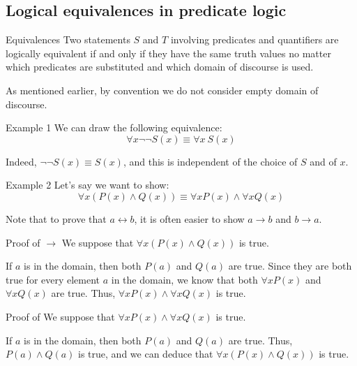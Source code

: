 \documentclass{article}
\begin{document}
\subsection{Logical equivalences in predicate logic}
\begin{parag}{Equivalences}
    Two statements $S$ and $T$ involving predicates and quantifiers are logically equivalent if and only if they have the same truth values no matter which predicates are substituted and which domain of discourse is used.

    As mentioned earlier, by convention we do not consider empty domain of discourse.
\end{parag}

\begin{parag}{Example 1}
    We can draw the following equivalence: 
    \[\forall x \lnot \lnot S\left(x\right) \equiv \forall x\ S\left(x\right)\]
    
    Indeed, $\lnot \lnot S\left(x\right) \equiv S\left(x\right)$, and this is independent of the choice of $S$ and of $x$.
\end{parag}

\begin{parag}{Example 2}
    Let's say we want to show: 
    \[\forall x \left(P\left(x\right) \land Q\left(x\right)\right) \equiv \forall x P\left(x\right) \land \forall x Q\left(x\right)\]

    Note that to prove that $a \leftrightarrow b$, it is often easier to show $a \to b$ and $b \to a$.
    
    \begin{subparag}{Proof of $\to$}
        We suppose that $\forall x\left(P\left(x\right) \land Q\left(x\right)\right)$ is true.

        If $a$ is in the domain, then both $P\left(a\right)$ and $Q\left(a\right)$ are true. Since they are both true for every element $a$ in the domain, we know that both $\forall x P\left(x\right)$ and $\forall x Q\left(x\right)$ are true. Thus, $\forall x P\left(x\right) \land \forall x Q\left(x\right)$ is true.
    \end{subparag}

    \begin{subparag}{Proof of \textleftarrow}
        We suppose that $\forall x P\left(x\right) \land \forall x Q\left(x\right)$ is true. 

        If $a$ is in the domain, then both $P\left(a\right)$ and $Q\left(a\right)$ are true. Thus, $P\left(a\right) \land Q\left(a\right)$ is true, and we can deduce that $\forall x\left(P\left(x\right) \land Q\left(x\right)\right)$ is true. 
    \end{subparag}
\end{parag}
\end{document}
